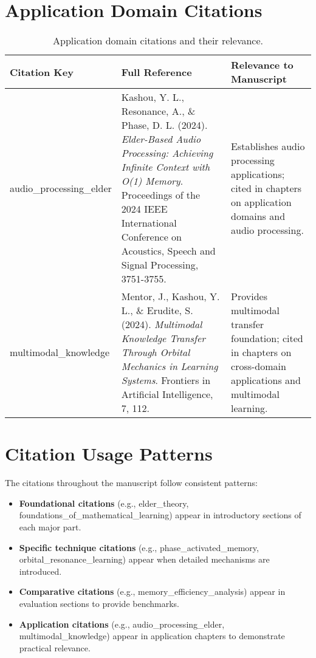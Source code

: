 \section{Application Domain Citations}

\begin{table}[h]
\centering
\begin{tabular}{|p{2.5cm}|p{5cm}|p{6cm}|}
\hline
\textbf{Citation Key} & \textbf{Full Reference} & \textbf{Relevance to Manuscript} \\
\hline
audio\_processing\_elder & Kashou, Y. L., Resonance, A., \& Phase, D. L. (2024). \textit{Elder-Based Audio Processing: Achieving Infinite Context with O(1) Memory}. Proceedings of the 2024 IEEE International Conference on Acoustics, Speech and Signal Processing, 3751-3755. & Establishes audio processing applications; cited in chapters on application domains and audio processing. \\
\hline
multimodal\_knowledge & Mentor, J., Kashou, Y. L., \& Erudite, S. (2024). \textit{Multimodal Knowledge Transfer Through Orbital Mechanics in Learning Systems}. Frontiers in Artificial Intelligence, 7, 112. & Provides multimodal transfer foundation; cited in chapters on cross-domain applications and multimodal learning. \\
\hline
\end{tabular}
\caption{Application domain citations and their relevance.}
\label{tab:application_citations}
\end{table}

\section{Citation Usage Patterns}

The citations throughout the manuscript follow consistent patterns:

\begin{itemize}
    \item \textbf{Foundational citations} (e.g., elder\_theory, foundations\_of\_mathematical\_learning) appear in introductory sections of each major part.
    \item \textbf{Specific technique citations} (e.g., phase\_activated\_memory, orbital\_resonance\_learning) appear when detailed mechanisms are introduced.
    \item \textbf{Comparative citations} (e.g., memory\_efficiency\_analysis) appear in evaluation sections to provide benchmarks.
    \item \textbf{Application citations} (e.g., audio\_processing\_elder, multimodal\_knowledge) appear in application chapters to demonstrate practical relevance.
\end{itemize}

